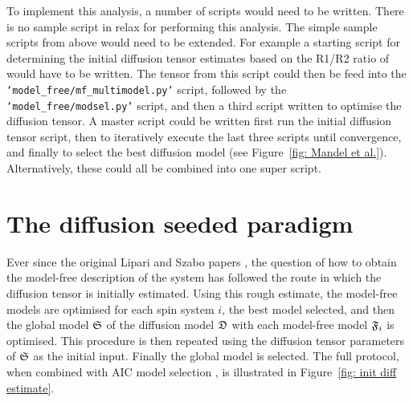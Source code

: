 \begin{htmlonly}
\begin{htmlonly}
To implement this analysis, a number of scripts would need to be written.  There is no sample script in relax for performing this analysis.  The simple sample scripts from above would need to be extended.  For example a starting script for determining the initial diffusion tensor estimates based on the R1/R2 ratio of \citet{Kay89} would have to be written.  The tensor from this script could then be feed into the \texttt{`model\_free/mf\_multimodel.py'} script, followed by the \texttt{`model\_free/modsel.py'} script, and then a third script written to optimise the diffusion tensor.  A master script could be written first run the initial diffusion tensor script, then to iteratively execute the last three scripts until convergence, and finally to select the best diffusion model (see Figure~\ref{fig: Mandel et al.}).  Alternatively, these could all be combined into one super script.




\section{The diffusion seeded paradigm}
\label{sect: diffusion seeded paradigm}

Ever since the original Lipari and Szabo papers \citep{LipariSzabo82a, LipariSzabo82b}, the question of how to obtain the model-free description of the system has followed the route in which the diffusion tensor is initially estimated.  Using this rough estimate, the model-free models are optimised for each spin system $i$, the best model selected, and then the global model $\mathfrak{S}$ of the diffusion model $\mathfrak{D}$ with each model-free model $\mathfrak{F}_i$ is optimised.  This procedure is then repeated using the diffusion tensor parameters of $\mathfrak{S}$ as the initial input.  Finally the global model is selected.  The full protocol, when combined with AIC model selection \citep{dAuvergneGooley03}, is illustrated in Figure~\ref{fig: init diff estimate}.



\end{htmlonly}
\end{htmlonly}
